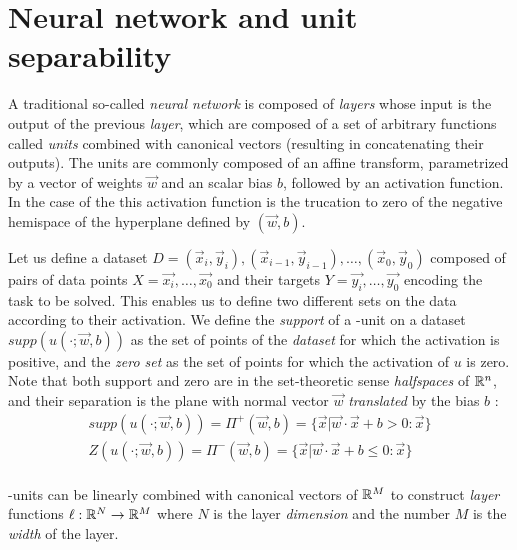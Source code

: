 \section{Neural network and unit separability}

A traditional so-called \emph{neural network} is composed of \emph{layers} whose input is the output of the previous \emph{layer}, which are composed of a set of arbitrary functions called \emph{units} combined with canonical vectors (resulting in concatenating their outputs). The units are commonly composed of an affine transform, parametrized by a vector of weights $\vec{w}$ and an scalar bias $b$, followed by an activation function. In the case of the \ReLU this activation function is the trucation to zero of the negative hemispace of the hyperplane defined by $(\vec{w},b)$. 

Let us define a dataset $D = {(\vec{x}_i, \vec{y}_i), (\vec{x}_{i-1}, \vec{y}_{i-1}), \dots, (\vec{x}_0, \vec{y}_0)}$ composed of pairs of data points $X = {\vec{x_i}, \dots, \vec{x_0}}$ and their targets $Y = {\vec{y_i}, \dots, \vec{y_0}}$ encoding the task to be solved. This enables us to define two different sets on the data according to their activation. We define the \emph{support} of a \ReLU-unit on a dataset $supp(u(\cdot;\vec{w},b))$ as the set of points of the \emph{dataset} for which the activation is positive, and the \emph{zero set} as the set of points for which the activation of $u$ is zero. Note that both support and zero are in the set-theoretic sense \emph{halfspaces} of $\mathbb{R}^{n}$, and their separation is the plane with normal vector $\vec{w}$ \emph{translated} by the bias $b$  \cite{florenzano2001ConvexAnalysis}\cite{convexOptimizationBoyd}:
\begin{equation}\label{eq:supportAndZerosOfUnit}
\begin{array}{lcl}
 supp(u(\cdot;\vec{w},b))=\Pi^{+}(\vec{w},b) = \{\vec{x}|\vec{w}\cdot\vec{x}+b>0:\vec{x}\}\\
    Z(u(\cdot;\vec{w},b))=\Pi^{-}(\vec{w},b) = \{\vec{x}|\vec{w}\cdot\vec{x}+b\leq 0:\vec{x}\}\\
\end{array}
\end{equation}

\ReLU-units can be linearly combined with canonical vectors of $\mathbb{R}^{M}$ to construct \ReLU \emph{layer} functions $\ell:\mathbb{R}^{N}\rightarrow\mathbb{R}^{M}$ where $N$ is the layer \emph{dimension} and the number $M$ is the \emph{width} of the layer.

